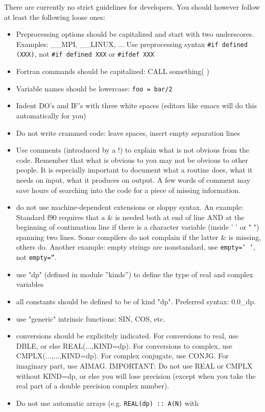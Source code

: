 \documentclass[12pt,a4paper]{article}
\begin{document}
There are currently no strict guidelines for developers. You
should however follow at least the following loose ones:
\begin{itemize}
\item Preprocessing options should be capitalized and start with
two underscores. Examples: \_\_MPI, \_\_LINUX, ... Use 
preprocessing syntax \verb|#if defined (XXX)|, not \verb|#if defined XXX|
or \verb|#ifdef XXX|
\item Fortran commands should be capitalized:
CALL something( )
\item Variable names should be lowercase: \texttt{foo = bar/2}
\item Indent DO's and IF's with three white spaces (editors like emacs will do this automatically for you)
\item Do not write crammed code: leave spaces, insert empty separation lines
\item Use comments (introduced by a !) to explain what is not obvious from
the code. Remember that what is obvious to you may not be obvious to other
people. It is especially important to document what a routine does, what
it needs on input, what it produces on output. A few words of comment
may save hours of searching into the code for a piece of missing information.
\item do not use machine-dependent extensions or sloppy syntax. An example:
Standard f90
requires that a \& is needed both at end of line AND at the beginning of
continuation line if there is a character variable (inside ' ' or " ")
spanning two lines. Some compilers do not complain if the latter \& is
missing, others do. Another example: empty strings are nonstandard, use
\texttt{empty='~'}, not \texttt{empty=''}.
\item use "dp" (defined in module ''kinds'') to define the type of real and complex variables
\item all constants should be defined to be of kind "dp".  Preferred syntax: 0.0\_dp.
\item use "generic" intrinsic functions: SIN, COS, etc.
\item conversions should be explicitely indicated. For conversions to real,
use DBLE, or else REAL(...,KIND=dp). For conversions to complex, use
CMPLX(...,...,KIND=dp). For complex conjugate, use CONJG.  For imaginary part,
use AIMAG.  IMPORTANT: Do not use REAL or CMPLX without KIND=dp, or else you
will lose precision (except when you take the real part of a
double precision complex number).
\item Do not use automatic arrays (e.g. \texttt{REAL(dp) :: A(N)} with

\end{itemize}
\end{document}
